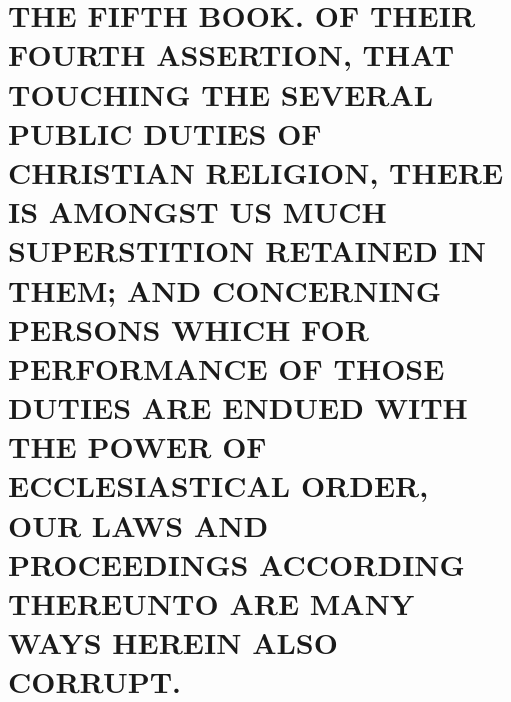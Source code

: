 \chapter*[The Fifth Book]{THE FIFTH BOOK. 
OF THEIR FOURTH ASSERTION, THAT TOUCHING THE SEVERAL PUBLIC DUTIES OF CHRISTIAN
RELIGION, THERE IS AMONGST US MUCH SUPERSTITION RETAINED IN THEM; AND CONCERNING
PERSONS WHICH FOR PERFORMANCE OF THOSE DUTIES ARE ENDUED WITH THE POWER OF
ECCLESIASTICAL ORDER, OUR LAWS AND PROCEEDINGS ACCORDING THEREUNTO ARE MANY WAYS
HEREIN ALSO CORRUPT.}
\label{chap:book5}








